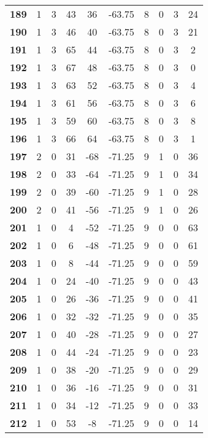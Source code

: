 \documentclass{article}%
\begin{document}
\begin{longtable}{cccccccccc}
        \textbf{189} & 1 & 3 & 43 & 36 & -63.75 & 8 & 0 & 3 & 24 \\ 
        \textbf{190} & 1 & 3 & 46 & 40 & -63.75 & 8 & 0 & 3 & 21 \\ 
        \textbf{191} & 1 & 3 & 65 & 44 & -63.75 & 8 & 0 & 3 & 2 \\ 
        \textbf{192} & 1 & 3 & 67 & 48 & -63.75 & 8 & 0 & 3 & 0 \\ 
        \textbf{193} & 1 & 3 & 63 & 52 & -63.75 & 8 & 0 & 3 & 4 \\ 
        \textbf{194} & 1 & 3 & 61 & 56 & -63.75 & 8 & 0 & 3 & 6 \\ 
        \textbf{195} & 1 & 3 & 59 & 60 & -63.75 & 8 & 0 & 3 & 8 \\ 
        \textbf{196} & 1 & 3 & 66 & 64 & -63.75 & 8 & 0 & 3 & 1 \\ 
        \textbf{197} & 2 & 0 & 31 & -68 & -71.25 & 9 & 1 & 0 & 36 \\ 
        \textbf{198} & 2 & 0 & 33 & -64 & -71.25 & 9 & 1 & 0 & 34 \\ 
        \textbf{199} & 2 & 0 & 39 & -60 & -71.25 & 9 & 1 & 0 & 28 \\ 
        \textbf{200} & 2 & 0 & 41 & -56 & -71.25 & 9 & 1 & 0 & 26 \\ 
        \textbf{201} & 1 & 0 & 4 & -52 & -71.25 & 9 & 0 & 0 & 63 \\ 
        \textbf{202} & 1 & 0 & 6 & -48 & -71.25 & 9 & 0 & 0 & 61 \\ 
        \textbf{203} & 1 & 0 & 8 & -44 & -71.25 & 9 & 0 & 0 & 59 \\ 
        \textbf{204} & 1 & 0 & 24 & -40 & -71.25 & 9 & 0 & 0 & 43 \\ 
        \textbf{205} & 1 & 0 & 26 & -36 & -71.25 & 9 & 0 & 0 & 41 \\ 
        \textbf{206} & 1 & 0 & 32 & -32 & -71.25 & 9 & 0 & 0 & 35 \\ 
        \textbf{207} & 1 & 0 & 40 & -28 & -71.25 & 9 & 0 & 0 & 27 \\ 
        \textbf{208} & 1 & 0 & 44 & -24 & -71.25 & 9 & 0 & 0 & 23 \\ 
        \textbf{209} & 1 & 0 & 38 & -20 & -71.25 & 9 & 0 & 0 & 29 \\ 
        \textbf{210} & 1 & 0 & 36 & -16 & -71.25 & 9 & 0 & 0 & 31 \\ 
        \textbf{211} & 1 & 0 & 34 & -12 & -71.25 & 9 & 0 & 0 & 33 \\ 
        \textbf{212} & 1 & 0 & 53 & -8 & -71.25 & 9 & 0 & 0 & 14 \\ 

\end{longtable}
\end{document}
